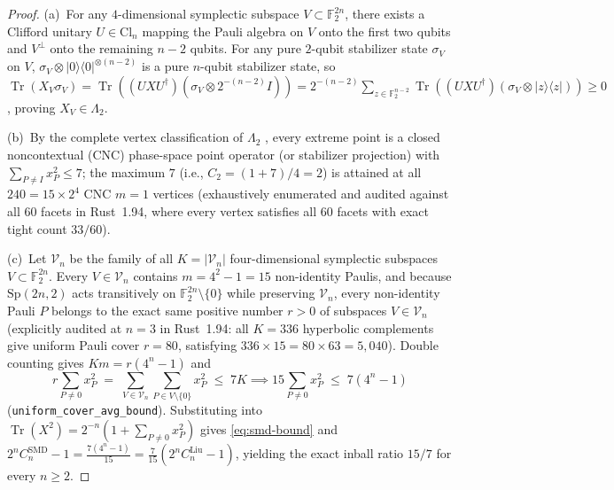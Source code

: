 \documentclass[11pt,reqno]{amsart}
\theoremstyle{definition}
\newcommand{\FF}{\mathbb{F}}
\newcommand{\Tr}{\operatorname{Tr}}
\newcommand{\Sp}{\mathrm{Sp}}
\newcommand{\Cl}{\mathrm{Cl}}
\newcommand{\lid}[1]{{\footnotesize\nolinkurl{#1}}}
\begin{document}
\begin{proof}
(a)~For any $4$-dimensional symplectic subspace $V \subset \FF_2^{2n}$, there exists a
Clifford unitary $U \in \Cl_n$ mapping the Pauli algebra on $V$ onto the first two qubits
and $V^\perp$ onto the remaining $n - 2$ qubits. For any pure $2$-qubit stabilizer state
$\sigma_V$ on $V$, $\sigma_V \otimes |0\rangle\langle 0|^{\otimes (n-2)}$ is a pure
$n$-qubit stabilizer state, so $\Tr(X_V \sigma_V) = \Tr((U X U^\dagger)(\sigma_V \otimes
2^{-(n-2)}I)) = 2^{-(n-2)}\sum_{z \in \FF_2^{n-2}} \Tr((U X U^\dagger)(\sigma_V \otimes
|z\rangle\langle z|)) \ge 0$, proving $X_V \in \Lambda_2$.

(b)~By the complete vertex classification of $\Lambda_2$ \cite{raussendorf2020phase,
zurel2020hvm}, every extreme point is a closed noncontextual (CNC) phase-space point
operator (or stabilizer projection) with $\sum_{P \ne I} x_P^2 \le 7$; the maximum
$7$ (i.e., $C_2 = (1+7)/4 = 2$) is attained at all $240 = 15 \times 2^4$ CNC $m=1$
vertices (exhaustively enumerated and audited against all $60$ facets in Rust~1.94,
where every vertex satisfies all $60$ facets with exact tight count $33/60$).

(c)~Let $\mathcal{V}_n$ be the family of all $K = |\mathcal{V}_n|$ four-dimensional
symplectic subspaces $V \subset \FF_2^{2n}$. Every $V \in \mathcal{V}_n$ contains
$m = 4^2 - 1 = 15$ non-identity Paulis, and because $\Sp(2n, 2)$ acts transitively on
$\FF_2^{2n} \setminus \{0\}$ while preserving $\mathcal{V}_n$, every non-identity Pauli
$P$ belongs to the exact same positive number $r > 0$ of subspaces $V \in \mathcal{V}_n$
(explicitly audited at $n=3$ in Rust~1.94: all $K = 336$ hyperbolic complements give
uniform Pauli cover $r = 80$, satisfying $336 \times 15 = 80 \times 63 = 5{,}040$).
Double counting gives $K m = r (4^n - 1)$ and
\[
  r \sum_{P \ne 0} x_P^2
  \;=\; \sum_{V \in \mathcal{V}_n} \sum_{P \in V \setminus \{0\}} x_P^2
  \;\le\; 7 K
  \implies
  15 \sum_{P \ne 0} x_P^2 \;\le\; 7(4^n - 1)
\]
(\lid{uniform_cover_avg_bound}). Substituting into $\Tr(X^2) = 2^{-n}(1 + \sum_{P \ne 0}
x_P^2)$ gives \eqref{eq:smd-bound} and $2^n C_n^{\mathrm{SMD}} - 1 =
\frac{7(4^n - 1)}{15} = \frac{7}{15}(2^n C_n^{\mathrm{Liu}} - 1)$, yielding the exact
inball ratio $15/7$ for every $n \ge 2$.
\end{proof}
\end{document}
